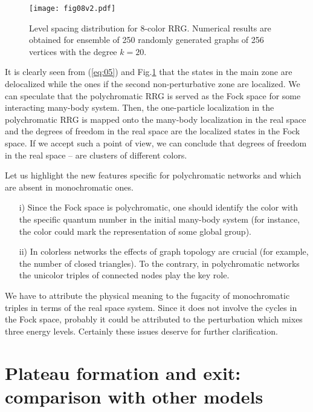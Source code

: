 \documentclass[aps,12pt]{revtex4}
\newcommand{\eq}[1]{(\ref{#1})}
\newcommand{\fig}[1]{Fig.\ref{#1}}
\begin{document}
\begin{figure}[ht]
\centerline{\texttt{[image: fig08v2.pdf]}}
\caption{Level spacing distribution for 8-color RRG. Numerical results are obtained for ensemble of 250 randomly generated graphs of 256 vertices with the degree  $k=20$. }
\label{fig:08}
\end{figure}

It is clearly seen from \eq{eq:05} and \fig{fig:08} that the states in the main zone are delocalized while the ones if the second non-perturbative zone are localized. We can speculate that the polychromatic RRG is served as the Fock space for some interacting many-body system. Then, the one-particle localization in the polychromatic RRG is mapped onto the many-body localization in the real space and the degrees of freedom in the real space are the localized states in the Fock space.  If we accept such a point of view, we can conclude that degrees of freedom in the real space -- are clusters of different colors.

Let us highlight the new features specific for polychromatic networks and which are absent in monochromatic ones.
\begin{itemize}
\item[i)] Since the Fock space is polychromatic, one should identify the color with the specific quantum number in the initial many-body system (for instance, the color could mark the representation of some global group).
\item[ii)] In colorless networks the effects of graph topology are crucial (for example, the number of closed triangles). To the contrary, in polychromatic networks the unicolor triples of connected nodes play the key role.
\end{itemize}

We have to attribute the physical meaning to the fugacity of monochromatic triples in terms of the real space system. Since it does not involve the cycles in the Fock space, probably it could be attributed to the perturbation which mixes three energy levels. Certainly these issues deserve for further clarification.

\section{Plateau formation and exit: comparison with other models}
\end{document}

